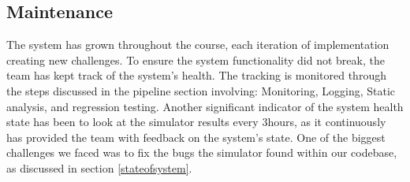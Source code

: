 \subsection{Maintenance}

The system has grown throughout the course, each iteration of implementation creating new challenges. To ensure the system functionality did not break, the team has kept track of the system's health. The tracking is monitored through the steps discussed in the pipeline section involving: Monitoring, Logging, Static analysis, and regression testing. Another significant indicator of the system health state has been to look at the simulator results every 3hours, as it continuously has provided the team with feedback on the system's state. One of the biggest challenges we faced was to fix the bugs the simulator found within our codebase, as discussed in section \ref{stateofsystem}.


